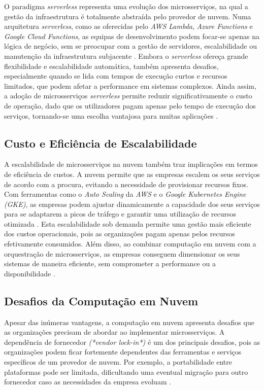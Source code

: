 O paradigma \textit{serverless} representa uma evolução dos microsserviços, na qual a gestão da infraestrutura é totalmente abstraída pelo provedor de nuvem. Numa arquitetura \textit{serverless}, como as oferecidas pelo \textit{ AWS Lambda}, \textit{ Azure Functions} e \textit{ Google Cloud Functions}, as equipas de desenvolvimento podem focar-se apenas na lógica de negócio, sem se preocupar com a gestão de servidores, escalabilidade ou manutenção da infraestrutura subjacente \cite{Dragoni2017}. Embora o \textit{serverless} ofereça grande flexibilidade e escalabilidade automática, também apresenta desafios, especialmente quando se lida com tempos de execução curtos e recursos limitados, que podem afetar a performance em sistemas complexos. Ainda assim, a adoção de microsserviços \textit{serverless} permite reduzir significativamente o custo de operação, dado que os utilizadores pagam apenas pelo tempo de execução dos serviços, tornando-se uma escolha vantajosa para muitas aplicações \cite{Richardson2018}.

\subsection{Custo e Eficiência de Escalabilidade}

A escalabilidade de microsserviços na nuvem também traz implicações em termos de eficiência de custos. A nuvem permite que as empresas escalem os seus serviços de acordo com a procura, evitando a necessidade de provisionar recursos fixos. Com ferramentas como o \textit{Auto Scaling} da \textit{ AWS} e o \textit{ Google Kubernetes Engine (GKE)}, as empresas podem ajustar dinamicamente a capacidade dos seus serviços para se adaptarem a picos de tráfego e garantir uma utilização de recursos otimizada \cite{Dragoni2017}. Esta escalabilidade sob demanda permite uma gestão mais eficiente dos custos operacionais, pois as organizações pagam apenas pelos recursos efetivamente consumidos. Além disso, ao combinar computação em nuvem com a orquestração de microsserviços, as empresas conseguem dimensionar os seus sistemas de maneira eficiente, sem comprometer a performance ou a disponibilidade \cite{Blinowski2022}.

\subsection{Desafios da Computação em Nuvem}

Apesar das inúmeras vantagens, a computação em nuvem apresenta desafios que as organizações precisam de abordar ao implementar microsserviços. A dependência de fornecedor \textit{(*vendor lock-in*)} é um dos principais desafios, pois as organizações podem ficar fortemente dependentes das ferramentas e serviços específicos de um provedor de nuvem. Por exemplo, a portabilidade entre plataformas pode ser limitada, dificultando uma eventual migração para outro fornecedor caso as necessidades da empresa evoluam \cite{Richardson2018}.

